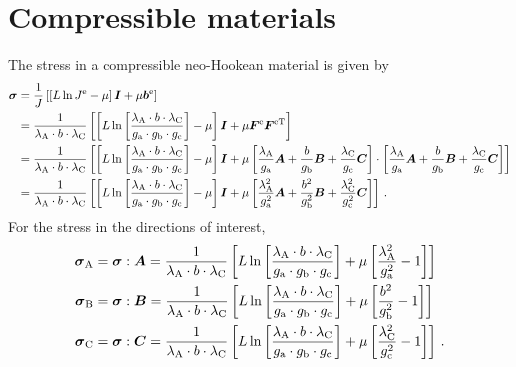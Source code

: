 \documentclass[10pt,letterpaper,oneside]{report}
\newcommand{\ten}[1]{\mbox{\boldmath $#1$}{}}
\newcommand{\scas}[1]{\mbox{{\scriptsize{${\rm{#1}}$}}}{}}
\begin{document}
\section{Compressible materials}
The stress in a compressible neo-Hookean material is given by 
\begin{align}
\ten{\sigma} &= \frac{1}{J} \left[ \left[ L \ln J^{\scas{e}} - \mu \right] \ten{I} + \mu \ten{b}^{\scas{e}} \right] \\
&= \frac{1}{\lambda_{\scas{A}} \cdot b \cdot \lambda_{\scas{C}}} \left[ \left[ L \ln \left[ \frac{\lambda_{\scas{A}} \cdot b \cdot \lambda_{\scas{C}} }{g_{\scas{a}} \cdot g_{\scas{b}} \cdot g_{\scas{c}}} \right] - \mu \right] \ten{I} + \mu \ten{F}^{\scas{e}} \ten{F}^{\scas{eT}} \right] \\
&= \frac{1}{\lambda_{\scas{A}} \cdot b \cdot \lambda_{\scas{C}}} \left[ \left[ L \ln \left[ \frac{\lambda_{\scas{A}} \cdot b \cdot \lambda_{\scas{C}} }{g_{\scas{a}} \cdot g_{\scas{b}} \cdot g_{\scas{c}}} \right] - \mu \right] \ten{I} + \mu \left[ \frac{\lambda_{\scas{A}} }{g_{\scas{a}}} \ten{A} + \frac{b}{g_{\scas{b}}} \ten{B} + \frac{\lambda_{\scas{C}} }{g_{\scas{c}}} \ten{C} \right] \cdot \left[ \frac{\lambda_{\scas{A}} }{g_{\scas{a}}} \ten{A} + \frac{b}{g_{\scas{b}}} \ten{B} + \frac{\lambda_{\scas{C}} }{g_{\scas{c}}} \ten{C} \right] \right] \\
&= \frac{1}{\lambda_{\scas{A}} \cdot b \cdot \lambda_{\scas{C}}} \left[ \left[ L \ln \left[ \frac{\lambda_{\scas{A}} \cdot b \cdot \lambda_{\scas{C}} }{g_{\scas{a}} \cdot g_{\scas{b}} \cdot g_{\scas{c}}} \right] - \mu \right] \ten{I} + \mu \left[ \frac{\lambda_{\scas{A}}^2 }{g_{\scas{a}}^2} \ten{A} + \frac{b^2}{g_{\scas{b}}^2} \ten{B} + \frac{\lambda_{\scas{C}}^2}{g_{\scas{c}}^2} \ten{C} \right] \right]  \, .
\end{align}
For the stress in the directions of interest,
\begin{align}
\ten{\sigma}_{\scas{A}} &= \ten{\sigma} : \ten{A} = \frac{1}{\lambda_{\scas{A}} \cdot b \cdot \lambda_{\scas{C}}} \left[ L \ln \left[ \frac{\lambda_{\scas{A}} \cdot b \cdot \lambda_{\scas{C}} }{g_{\scas{a}} \cdot g_{\scas{b}} \cdot g_{\scas{c}}} \right] + \mu \left[ \frac{\lambda_{\scas{A}}^2 }{g_{\scas{a}}^2} - 1 \right] \right] 
\\
\ten{\sigma}_{\scas{B}} &= \ten{\sigma} : \ten{B} = \frac{1}{\lambda_{\scas{A}} \cdot b \cdot \lambda_{\scas{C}}} \left[ L \ln \left[ \frac{\lambda_{\scas{A}} \cdot b \cdot \lambda_{\scas{C}} }{g_{\scas{a}} \cdot g_{\scas{b}} \cdot g_{\scas{c}}} \right] + \mu \left[ \frac{b^2}{g_{\scas{b}}^2} - 1 \right] \right] 
\\
\ten{\sigma}_{\scas{C}} &= \ten{\sigma} : \ten{C} = \frac{1}{\lambda_{\scas{A}} \cdot b \cdot \lambda_{\scas{C}}} \left[ L \ln \left[ \frac{\lambda_{\scas{A}} \cdot b \cdot \lambda_{\scas{C}} }{g_{\scas{a}} \cdot g_{\scas{b}} \cdot g_{\scas{c}}} \right] + \mu \left[ \frac{\lambda_{\scas{C}}^2}{g_{\scas{c}}^2} - 1 \right] \right]  \, .
\end{align}
\end{document}
